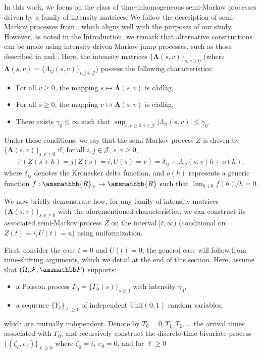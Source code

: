 \documentclass[11pt,leqno]{amsart}
\numberwithin{table}{section}
\numberwithin{figure}{section}
\numberwithin{equation}{section}
\newcommand{\1}{{\mathds{1}}}
\newcommand{\0}{\mat{0}}
\newcommand{\R}{\amsmathbb{R}}
\renewcommand{\P }{{\amsmathbb P}}
\begin{document}
{ In this work, we focus on the class of time-inhomogeneous semi-Markov processes driven by a family of intensity matrices. We follow the description of semi-Markov processes from \cite{janssen1984finite}, which aligns well with the purposes of our study. However, as noted in the Introduction, we remark that alternative constructions can be made using intensity-driven Markov jump processes, such as those described in \cite[Chapter 2]{davis2018markov} and \cite[Chapter 7]{jacobsen2006point}. Here, the intensity matrices $\{\bm{\Lambda}(s,v)\}_{s,v\ge 0}$ (where $\bm{\Lambda}(s,v)=\{\Lambda_{ij}(s,v)\}_{i,j\in\mathcal{J}}$) possess the following characteristics:}
\begin{itemize}
       \item For all $v\ge 0$, the mapping $s\mapsto \bm{\Lambda}(s, v)$ is c\`adl\`ag,
       \item For all $s\ge 0$, the mapping $v\mapsto \bm{\Lambda}(s, v)$ is c\`adl\`ag,
       \item There exists $\gamma_0\le \infty$ such that $\sup_{s,v\ge 0, i\in\mathcal{J}} |\Lambda_{ii}(s,v)|\le \gamma_0$.
\end{itemize}
Under these conditions, we say that the semi-Markov process $Z$ is driven by $\{\bm{\Lambda}(s,v)\}_{s,v\ge 0}$ if, for all $i,j\in\mathcal{J},\, s,v\ge 0$,
\begin{align}
\mathds{P}\left(Z(s+h)=j\,|\, Z(s)=i, U(s)=v\right) = \delta_{ij} + \Lambda_{ij}(s,v)h + o(h),\label{eq:Z_semi1}
\end{align}
where $\delta_{ij}$ denotes the Kronecker delta function, and $o(h)$ represents a generic function $f:\R_+\rightarrow\R$ such that $\lim_{h\downarrow 0} f(h)/h = 0$.

We now briefly demonstrate how, for any family of intensity matrices $\{\bm{\Lambda}(s,v)\}_{s,v\ge 0}$ with the aforementioned characteristics, we can construct its associated semi-Markov process $Z$ on the interval $[t,\infty)$ (conditional on $Z(t)=i, U(t)=u$) using uniformization. 

First, consider the case $t=0$ and $U(t)=0$; the general case will follow from time-shifting arguments, which we detail at the end of this section. Here, assume that $(\Omega,\mathcal{F},\P)$ supports:
\begin{itemize}
       \item a Poisson process $\Gamma_0=\{\Gamma_0(s)\}_{s\ge 0}$ with intensity $\gamma_0$,
       \item a sequence $\{Y_\ell\}_{\ell\ge 1}$ of independent $\mbox{Unif}(0,1)$ random variables,
\end{itemize}
which are mutually independent.  Denote by $T_0=0, T_1, T_2,\dots$ the arrival times associated with $\Gamma_0$, and recursively construct the discrete-time bivariate process $\{(\zeta_\ell, \upsilon_\ell)\}_{\ell \ge 0}$ where $\zeta_0=i$, $\upsilon_0=0$, and for $\ell\ge 0$
\end{document}
